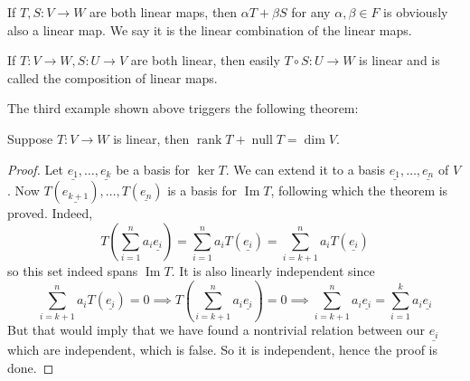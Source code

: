 \begin{definition}
    If $T,S:V\to W$ are both linear maps, then $\alpha T+\beta S$ for any $\alpha,\beta\in F$ is obviously also a linear map.
    We say it is the linear combination of the linear maps.
\end{definition}
\begin{definition}
    If $T:V\to W, S:U\to V$ are both linear, then easily $T\circ S:U\to W$ is linear and is called the composition of linear maps.
\end{definition}
The third example shown above triggers the following theorem:
\begin{theorem}
    Suppose $T:V\to W$ is linear, then $\operatorname{rank}T+\operatorname{null}T=\dim V$.
\end{theorem}
\begin{proof}
    Let $\underline{e_1},\ldots,\underline{e_k}$ be a basis for $\ker T$.
    We can extend it to a basis $\underline{e_1},\ldots,\underline{e_n}$ of $V$.
    Now $T(\underline{e_{k+1}}),\ldots,T(\underline{e_n})$ is a basis for $\operatorname{Im}T$, following which the theorem is proved.
    Indeed,
    $$T\left(\sum_{i=1}^na_i\underline{e_i}\right)=\sum_{i=1}^na_iT(\underline{e_i})=\sum_{i=k+1}^na_iT(\underline{e_i})$$
    so this set indeed spans $\operatorname{Im}T$.
    It is also linearly independent since
    $$\sum_{i=k+1}^na_iT(\underline{e_i})=0\implies T\left(\sum_{i=k+1}^na_i\underline{e_i}\right)=0\implies \sum_{i=k+1}^na_i\underline{e_i}=\sum_{i=1}^ka_i\underline{e_i}$$
    But that would imply that we have found a nontrivial relation between our $\underline{e_i}$ which are independent, which is false.
    So it is independent, hence the proof is done.
\end{proof}

